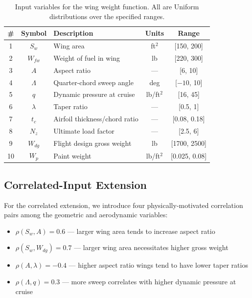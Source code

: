 \documentclass[11pt,a4paper]{article}
\begin{document}
\begin{table}[H]
\centering
\caption{Input variables for the wing weight function. All are Uniform distributions over the specified ranges.}
\label{tab:inputs}
\begin{tabular}{cclcc}
\toprule
\# & Symbol & Description & Units & Range \\
\midrule
1  & $S_w$   & Wing area                     & ft$^2$  & [150, 200] \\
2  & $W_{fw}$ & Weight of fuel in wing        & lb      & [220, 300] \\
3  & $A$    & Aspect ratio                  & ---     & [6, 10] \\
4  & $\Lambda$ & Quarter-chord sweep angle   & deg     & [$-10$, 10] \\
5  & $q$    & Dynamic pressure at cruise    & lb/ft$^2$ & [16, 45] \\
6  & $\lambda$ & Taper ratio                & ---     & [0.5, 1] \\
7  & $t_c$  & Airfoil thickness/chord ratio & ---     & [0.08, 0.18] \\
8  & $N_z$  & Ultimate load factor          & ---     & [2.5, 6] \\
9  & $W_{dg}$ & Flight design gross weight  & lb      & [1700, 2500] \\
10 & $W_p$  & Paint weight                  & lb/ft$^2$ & [0.025, 0.08] \\
\bottomrule
\end{tabular}
\end{table}

\subsection{Correlated-Input Extension}

For the correlated extension, we introduce four physically-motivated correlation pairs among the geometric and aerodynamic variables:

\begin{itemize}[nosep]
    \item $\rho(S_w, A) = 0.6$ --- larger wing area tends to increase aspect ratio
    \item $\rho(S_w, W_{dg}) = 0.7$ --- larger wing area necessitates higher gross weight
    \item $\rho(A, \lambda) = -0.4$ --- higher aspect ratio wings tend to have lower taper ratios
    \item $\rho(\Lambda, q) = 0.3$ --- more sweep correlates with higher dynamic pressure at cruise
\end{itemize}
\end{document}
